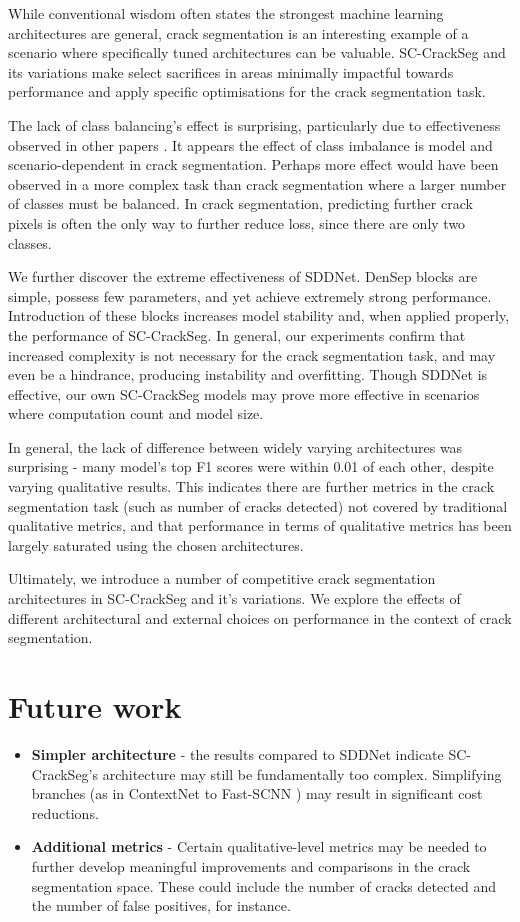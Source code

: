 \documentclass[a4paper,12pt]{report}
\begin{document}
While conventional wisdom often states the strongest machine learning architectures are general, crack segmentation is an interesting example of a scenario where specifically tuned architectures can be valuable. SC-CrackSeg and its variations make select sacrifices in areas minimally impactful towards performance and apply specific optimisations for the crack segmentation task.

The lack of class balancing's effect is surprising, particularly due to effectiveness observed in other papers \cite{liu_deepcrack_2019}. It appears the effect of class imbalance is model and scenario-dependent in crack segmentation. Perhaps more effect would have been observed in a more complex task than crack segmentation where a larger number of classes must be balanced. In crack segmentation, predicting further crack pixels is often the only way to further reduce loss, since there are only two classes.

We further discover the extreme effectiveness of SDDNet. DenSep blocks are simple, possess few parameters, and yet achieve extremely strong performance. Introduction of these blocks increases model stability and, when applied properly, the performance of SC-CrackSeg. In general, our experiments confirm that increased complexity is not necessary for the crack segmentation task, and may even be a hindrance, producing instability and overfitting. Though SDDNet is effective, our own SC-CrackSeg models may prove more effective in scenarios where computation count and model size.

In general, the lack of difference between widely varying architectures was surprising - many model's top F1 scores were within 0.01 of each other, despite varying qualitative results. This indicates there are further metrics in the crack segmentation task (such as number of cracks detected) not covered by traditional qualitative metrics, and that performance in terms of qualitative metrics has been largely saturated using the chosen architectures.

Ultimately, we introduce a number of competitive crack segmentation architectures in SC-CrackSeg and it's variations. We explore the effects of different architectural and external choices on performance in the context of crack segmentation.

\section{Future work}
\begin{itemize}
    \item \textbf{Simpler architecture} - the results compared to SDDNet indicate SC-CrackSeg's architecture may still be fundamentally too complex. Simplifying branches (as in ContextNet \cite{poudel_contextnet_2018} to Fast-SCNN \cite{poudel_fast-scnn_2019}) may result in significant cost reductions.
    \item \textbf{Additional metrics} - Certain qualitative-level metrics may be needed to further develop meaningful improvements and comparisons in the crack segmentation space. These could include the number of cracks detected and the number of false positives, for instance.
\end{itemize}
\end{document}
